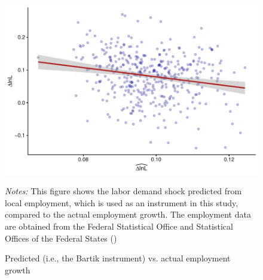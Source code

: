 \documentclass[
  12pt,
]{article}
\begin{document}
\begin{figure}[H]
\centering

\begin{center}\includegraphics{output/figs/predicted-vs-actual-labor-demand-shock-1} \end{center}

\caption{Predicted (i.e., the Bartik instrument) vs. actual employment growth}
\medskip
\begin{minipage}{0.9\textwidth}
\footnotesize
\textit{Notes:} This figure shows the labor demand shock predicted from local employment, which is used as an instrument in this study, compared to the actual employment growth. The employment data are obtained from the Federal Statistical Office and Statistical Offices of the Federal States ()
\end{minipage}
\end{figure}
\end{document}
